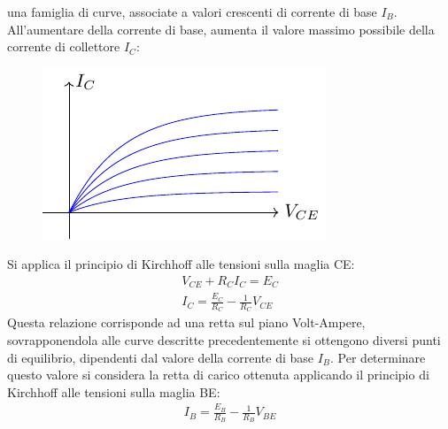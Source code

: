 \documentclass{article}
\numberwithin{equation}{subsection}
\begin{document}
una famiglia di curve, associate a valori crescenti di corrente di base $I_B$. All'aumentare della corrente di base, aumenta il valore massimo 
possibile della corrente di collettore $I_C$:
\begin{figure}[H]%
    \centering
    \includegraphics{andamento-collettore.pdf}%
    \label{fig:andamento-collettore}
\end{figure}

Si applica il principio di Kirchhoff alle tensioni sulla maglia CE:
\begin{gather*}
    V_{CE}+R_CI_C=E_C\\
    I_C=\displaystyle\frac{E_C}{R_C}-\frac{1}{R_C}V_{CE}
\end{gather*}
Questa relazione corrisponde ad una retta sul piano Volt-Ampere, sovrapponendola alle curve descritte precedentemente si ottengono diversi punti di 
equilibrio, dipendenti dal valore della corrente di base $I_B$. Per determinare questo valore si considera la retta di carico ottenuta applicando 
il principio di Kirchhoff alle tensioni sulla maglia BE:
\begin{gather*}
    I_B=\displaystyle\frac{E_B}{R_B}-\frac{1}{R_B}V_{BE}
\end{gather*}
\end{document}
